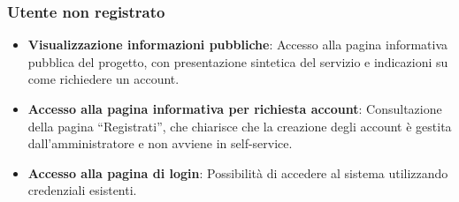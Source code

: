 ﻿\documentclass[a4paper,11pt]{article}
\begin{document}
\subsubsection{Utente non registrato}
\begin{itemize}
  \item \textbf{Visualizzazione informazioni pubbliche}: Accesso alla pagina informativa pubblica del progetto, con presentazione sintetica del servizio e indicazioni su come richiedere un account.
  \item \textbf{Accesso alla pagina informativa per richiesta account}: Consultazione della pagina ``Registrati'', che chiarisce che la creazione degli account \`e gestita dall'amministratore e non avviene in self-service.
  \item \textbf{Accesso alla pagina di login}: Possibilit\`a di accedere al sistema utilizzando credenziali esistenti.
\end{itemize}
\end{document}

